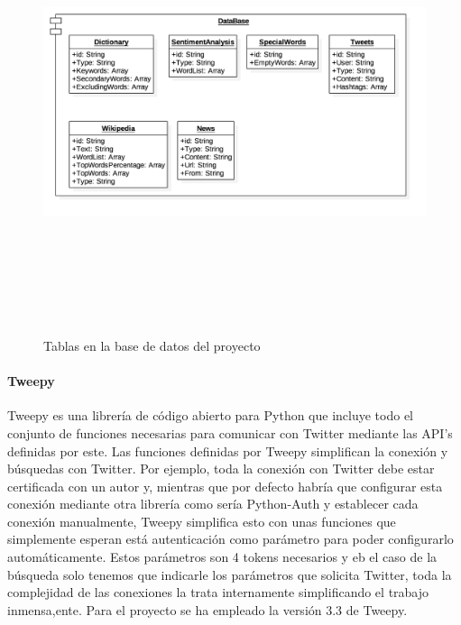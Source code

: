 \documentclass[../all.tex]{subfiles}
\begin{document}
        \begin{figure}[H]
        \centering
            \includegraphics[height=13cm, width=15cm]{imgs/DB.png}
            \caption{Tablas en la base de datos del proyecto}
        \end{figure}
    
        \paragraph{Tweepy}
            Tweepy es una librería de código abierto para Python que incluye todo el conjunto de funciones necesarias para comunicar con Twitter mediante las API's definidas por este. Las funciones definidas por Tweepy simplifican la conexión y búsquedas con Twitter. Por ejemplo, toda la conexión con Twitter debe estar certificada con un autor y, mientras que por defecto habría que configurar esta conexión mediante otra librería como sería Python-Auth y establecer cada conexión manualmente, Tweepy simplifica esto con unas funciones que simplemente esperan está autenticación como parámetro para poder configurarlo automáticamente. Estos parámetros son 4 tokens necesarios y eb el caso de la búsqueda solo tenemos que indicarle los parámetros que solicita Twitter, toda la complejidad de las conexiones la trata internamente simplificando el trabajo inmensa,ente. Para el proyecto se ha empleado la versión 3.3 de Tweepy.
\end{document}
